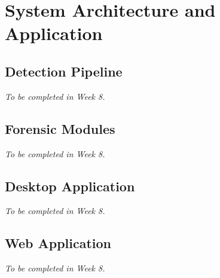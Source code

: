 
\chapter{System Architecture and Application}\label{chap:system}


\section{Detection Pipeline}\label{sec:pipeline}
\textit{To be completed in Week 8.}

\section{Forensic Modules}\label{sec:forensic_modules}
\textit{To be completed in Week 8.}

\section{Desktop Application}\label{sec:desktop_app}
\textit{To be completed in Week 8.}

\section{Web Application}\label{sec:web_app}
\textit{To be completed in Week 8.}
